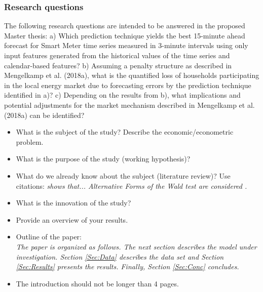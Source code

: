 \subsubsection{Research questions}
The following research questions are intended to be answered in the proposed Master thesis:
a)	Which prediction technique yields the best 15-minute ahead forecast  for Smart Meter time series measured in 3-minute intervals using only input features generated from the historical values of the time series and calendar-based features?
b)	Assuming a penalty structure as described in Mengelkamp et al. (2018a), what is the quantified loss of households participating in the local energy market due to forecasting errors by the prediction technique identified in a)?
c)	Depending on the results from b), what implications and potential adjustments for the market mechanism described in Mengelkamp et al. (2018a) can be identified?




\begin{itemize}

    \item What is the subject of the study? Describe the
        economic/econometric problem.

    \item What is the purpose of the study (working hypothesis)?

    \item What do we already know about the subject (literature
        review)? Use citations: {\it \citet{Gallant:87} shows that...
        Alternative Forms of the Wald test are considered
        \citep{Breusch&Schmidt:88}.}

    \item What is the innovation of the study?

    \item Provide an overview of your results.


    \item Outline of the paper:\\
        {\it The paper is organized as follows. The next section describes the
        model under investigation. Section \ref{Sec:Data} describes the data set
        and Section \ref{Sec:Results} presents the results. Finally, Section
        \ref{Sec:Conc} concludes.}

    \item The introduction should not be longer than 4 pages.

\end{itemize}
